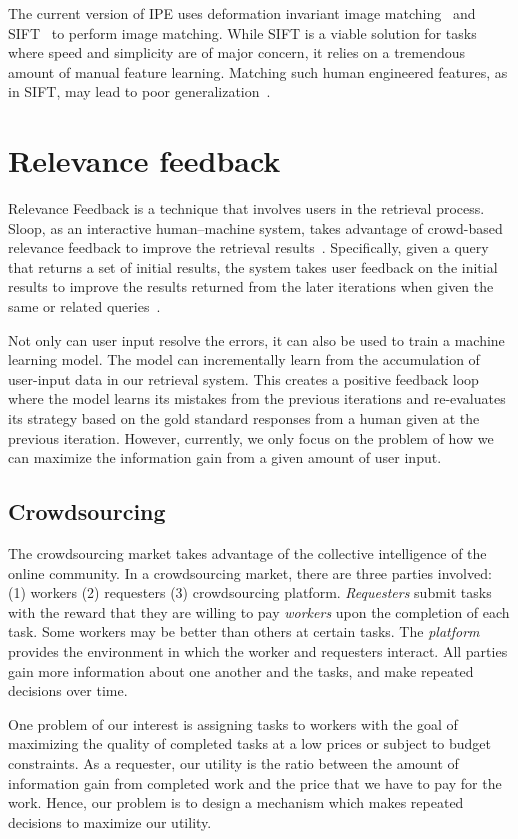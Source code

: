The current version of IPE uses deformation invariant image
matching~\cite{yang09} and SIFT~\cite{lowe04} to perform image matching. While
SIFT is a viable solution for tasks where speed and simplicity are of major
concern, it relies on a tremendous amount of manual feature learning. Matching
such human engineered features, as in SIFT, may lead to poor
generalization~\cite{fisher14}.


\section{Relevance feedback} %
\label{sec:relevance_feedback}

Relevance Feedback is a technique that involves users in the retrieval process.
Sloop, as an interactive human–machine system, takes advantage of crowd-based
relevance feedback to improve the retrieval results~\cite{sloop15}.
Specifically, given a query that returns a set of initial results, the system
takes user feedback on the initial results to improve the results returned from
the later iterations when given the same or related
queries~\cite{manning2008introduction}.

Not only can user input resolve the errors, it can also be used to train a
machine learning model. The model can incrementally learn from the accumulation
of user-input data in our retrieval system. This creates a positive feedback
loop where the model learns its mistakes from the previous iterations and
re-evaluates its strategy based on the gold standard responses from a human
given at the previous iteration. However, currently, we only focus on the
problem of how we can maximize the information gain from a given amount of user
input.

\subsection{Crowdsourcing}

The crowdsourcing market takes advantage of the collective intelligence of the
online community. In a crowdsourcing market, there are three parties involved:
(1) workers (2) requesters (3) crowdsourcing platform.  \emph{Requesters} submit
tasks with the reward that they are willing to pay \emph{workers} upon the
completion of each task. Some workers may be better than others at certain
tasks. The \emph{platform} provides the environment in which the worker and
requesters interact. All parties gain more information about one another and the
tasks, and make repeated decisions over time.

One problem of our interest is assigning tasks to workers with the goal of
maximizing the quality of completed tasks at a low prices or subject to budget
constraints. As a requester, our utility is the ratio between the amount of
information gain from completed work and the price that we have to pay for the
work. Hence, our problem is to design a mechanism which makes repeated decisions
to maximize our utility.


